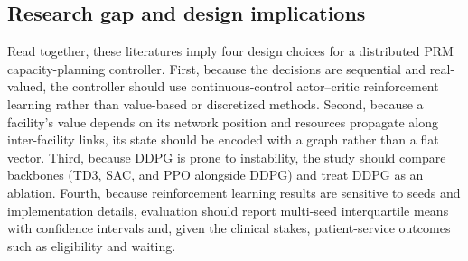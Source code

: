 \documentclass[preprint,review,12pt,nonatbib]{elsarticle}
\providecommand{\DIFadd}[1]{{\protect\color{blue}#1}} %
\providecommand{\DIFdel}[1]{} %
\providecommand{\DIFaddbegin}{} %
\providecommand{\DIFaddend}{} %
\providecommand{\DIFdelbegin}{} %
\providecommand{\DIFdelend}{} %
\providecommand{\DIFscaledelfig}{0.5}
\newlength{\DIFdelgraphicswidth} %
\newlength{\DIFdelgraphicsheight} %
\providecommand{\DIFaddincludegraphics}[2][]{{\color{blue}\fbox{\DIFOincludegraphics[#1]{#2}}}} %
\providecommand{\DIFdelincludegraphics}[2][]{%
\sbox{\DIFdelgraphicsbox}{\DIFOincludegraphics[#1]{#2}}%
\settoboxwidth{\DIFdelgraphicswidth}{\DIFdelgraphicsbox} %
\settoboxtotalheight{\DIFdelgraphicsheight}{\DIFdelgraphicsbox} %
\scalebox{\DIFscaledelfig}{%
\parbox[b]{\DIFdelgraphicswidth}{\usebox{\DIFdelgraphicsbox}\\[-\baselineskip] \rule{\DIFdelgraphicswidth}{0em}}\llap{\resizebox{\DIFdelgraphicswidth}{\DIFdelgraphicsheight}{%
\setlength{\unitlength}{\DIFdelgraphicswidth}%
\begin{picture}(1,1)%
\thicklines\linethickness{2pt} %
{\color[rgb]{1,0,0}\put(0,0){\framebox(1,1){}}}%
{\color[rgb]{1,0,0}\put(0,0){\line( 1,1){1}}}%
{\color[rgb]{1,0,0}\put(0,1){\line(1,-1){1}}}%
\end{picture}%
}\hspace*{3pt}}} %
} %
\DeclareRobustCommand{\DIFaddbegin}{\DIFOaddbegin \let\includegraphics\DIFaddincludegraphics} %
\DeclareRobustCommand{\DIFaddend}{\DIFOaddend \let\includegraphics\DIFOincludegraphics} %
\DeclareRobustCommand{\DIFdelbegin}{\DIFOdelbegin \let\includegraphics\DIFdelincludegraphics} %
\DeclareRobustCommand{\DIFdelend}{\DIFOaddend \let\includegraphics\DIFOincludegraphics} %
\begin{document}
\subsection{Research gap \DIFaddbegin \DIFadd{and design implications}\DIFaddend }
\DIFdelbegin \DIFdel{The literature indicates three important trends}\DIFdelend \DIFaddbegin \DIFadd{Read together, these literatures imply four design choices for a distributed PRM capacity-planning controller}\DIFaddend . First, \DIFdelbegin \DIFdel{PRM manufacturing requires adaptive capacity planning because patient-specific demand, consumable availability, and production capacity jointly determine treatment fulfillment. Second, reinforcement learning provides a data-driven approach for sequential operational decisions under uncertainty. Third, graph neural networks provide a natural representation for supply chains and distributed manufacturing networks with relational dependencies. Nevertheless, limited work has integrated graph convolutional representation learning with }\DIFdelend \DIFaddbegin \DIFadd{because the decisions are sequential and real-valued, the controller should use continuous-control }\DIFaddend actor--critic reinforcement learning \DIFdelbegin \DIFdel{for distributed PRM manufacturing networks}\DIFdelend \DIFaddbegin \DIFadd{rather than value-based or discretized methods. Second, because a facility's value depends on its network position and resources propagate along inter-facility links, its state should be encoded with a graph rather than a flat vector. Third, because DDPG is prone to instability, the study should compare backbones (TD3, SAC, and PPO alongside DDPG) and treat DDPG as an ablation. Fourth, because reinforcement learning results are sensitive to seeds and implementation details, evaluation should report multi-seed interquartile means with confidence intervals and, given the clinical stakes, patient-service outcomes such as eligibility and waiting}\DIFaddend .
\end{document}
